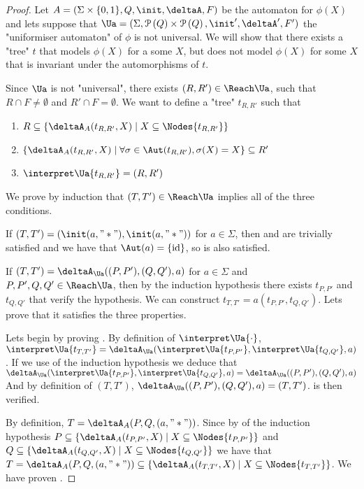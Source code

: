 \documentclass[a4paper,UKenglish,cleveref, autoref, thm-restate]{lipics-v2021}
\begin{document}
\begin{proof}  
	Let $A =  (\Sigma \times \{0,1\}, Q, \init, \deltaA, F)$ be the automaton for $\phi(X)$ and lets suppose that
	$\Ua = (\Sigma, \parts Q \times \parts Q,\init', \deltaA', F')$ the "uniformiser automaton" of $\phi$ is not universal.
	We will show that there exists a "tree" $t$ that models  $\phi(X)$ for a some $X$, but does not model $\phi(X)$ for
	some $X$ that is invariant under the automorphisms of $t$.

	Since $\Ua$ is not "universal", there exists $(R,R') \in \Reach \Ua$, such that $R \cap F \neq \emptyset$ and $R' \cap F = \emptyset$.
	We want to define a "tree" $t_{R,R'}$ such that
	\begin{enumerate}
		\item $R \subseteq \{ \deltaA_A (t_{R,R'},X) \mid X \subseteq \Nodes {t_{R,R'}}\}$ \label{lem:prop1}
		\item $\{ \deltaA_A (t_{R,R'},X) \mid \forall \sigma \in \Aut(t_{R,R'}), \sigma(X) = X\} \subseteq R'$\label{lem:prop2}
		\item $\interpret \Ua {t_{R,R'}} = (R,R')$\label{lem:prop3}
	\end{enumerate}

	We prove by induction that $(T,T') \in \Reach \Ua$ implies all of the three conditions.

	If $(T,T') = (\init(a,"*"), \init (a, "*"))$ for $a \in \Sigma$, then  and  are trivially satisfied and we have that
	$\Aut (a) = \{\text{id}\}$, so  is also satisfied.

	If $(T,T') = \deltaA_{\Ua}((P,P'),(Q,Q'),a)$ for $a \in \Sigma$ and $P,P',Q,Q' \in \Reach \Ua$, then by the induction hypothesis there exists
	$t_{P,P'}$ and $t_{Q,Q'}$ that verify the hypothesis. We can construct $t_{T,T'} = a(t_{P,P'},t_{Q,Q'})$. Lets prove that it satisfies the
	three properties.

	Lets begin by proving .
	By definition of $\interpret \Ua {\cdot}$,
	$\interpret \Ua {t_{T,T'}} = \deltaA_{\Ua} (\interpret \Ua {t_{P,P'}}, \interpret \Ua {t_{Q,Q'}}, a)$.
	If we use  of the induction hypothesis we deduce that
	$\deltaA_{\Ua} (\interpret \Ua {t_{P,P'}}, \interpret \Ua {t_{Q,Q'}}, a) = \deltaA_{\Ua} ((P,P'), (Q,Q'), a)$
	And by definition of $(T,T')$, $\deltaA_{\Ua} ((P,P'), (Q,Q'), a) = (T,T')$.
	 is then verified.

	By definition, $T = \deltaA_A(P,Q,(a,"*"))$. Since by  of the induction hypothesis $P \subseteq \{ \deltaA_A (t_{P,P'},X) \mid X \subseteq \Nodes {t_{P,P'}}\}$
	and $Q \subseteq \{ \deltaA_A (t_{Q,Q'},X) \mid X \subseteq \Nodes {t_{Q,Q'}}\}$  we have that
	$T = \deltaA_A(P,Q,(a,"*")) \subseteq \{ \deltaA_A (t_{T,T'},X) \mid X \subseteq \Nodes {t_{T,T'}}\}$. We have proven .


\end{proof}
\end{document}

